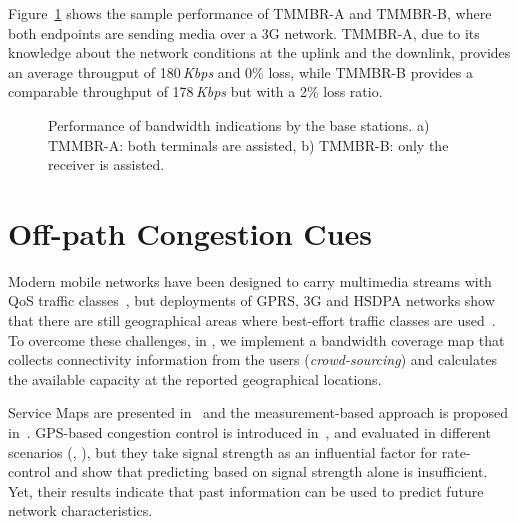Figure~\ref{fig:tmmbn} shows the sample performance of TMMBR-A and TMMBR-B,
where both endpoints are sending media over a 3G network. TMMBR-A, due to its
knowledge about the network conditions at the uplink and the downlink, provides
an average througput of 180\,\emph{Kbps} and 0\% loss, while TMMBR-B provides a
comparable throughput of 178\,\emph{Kbps} but with a 2\% loss ratio.


\begin{figure}
  \centerline{
  }
  \caption{Performance of bandwidth indications by the base
  stations. a) TMMBR-A: both terminals are assisted, b) TMMBR-B: only the receiver
  is assisted.}
  \label{fig:tmmbn}
\end{figure}


\section{Off-path Congestion Cues}


Modern mobile networks have been designed to carry multimedia streams with QoS
traffic classes~\cite{3gpp.23.107}, but deployments of GPRS, 3G and HSDPA
networks show that there are still geographical areas where best-effort
traffic classes are used~\cite{Curcio:glass, 6012045}. To overcome these challenges, in
, we implement a bandwidth coverage map that collects
connectivity information from the users (\emph {crowd-sourcing}) and
calculates the available capacity at the reported geographical locations.

Service Maps are presented in~\cite{1630563} and the measurement-based
approach is proposed in~\cite{Aravinda:2008p14}. GPS-based congestion control
is introduced in~\cite{Yao:2008p21}, and evaluated in different
scenarios (\cite{Yao:2009p57}, \cite{Yao:2010p64}), but they take signal
strength as an influential factor for rate-control and show that predicting
based on signal strength alone is insufficient. Yet, their results indicate
that past information can be used to predict future network characteristics.

